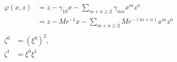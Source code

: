 \documentclass[letterpaper,12pt]{article}
\begin{document}
\pagestyle{empty}
\thispagestyle{empty}

\noindent

\begin{gather} 
 \begin{split} 
  \varphi(x,z) & = z - \gamma_{10} x - \sum_{m+n\ge2} \gamma_{mn} x^m z^n \\ 
               & = z - M r^{-1} x - \sum_{m+n\ge2} M r^{-(m+n)} x^m z^n 
 \end{split} \\[6pt] 
 \begin{align*} 
  \zeta^0 &= (\xi^0)^2, \\ 
  \zeta^1 &= \xi^0 \xi^1 
 \end{align*}
\end{gather}
\end{document}
